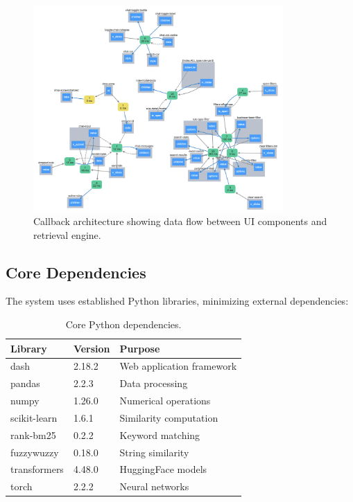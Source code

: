 \begin{figure}[!htbp]
\centering
\includegraphics[width=0.85\textwidth]{Figures/callback_map.png}
\caption{Callback architecture showing data flow between UI components and retrieval engine.}
\label{fig:callback-map}
\end{figure}

\subsection{Core Dependencies}

The system uses established Python libraries, minimizing external dependencies:

\begin{table}[!htbp]
\centering
\small
\begin{tabular}{lll}
\toprule
\textbf{Library} & \textbf{Version} & \textbf{Purpose} \\
\midrule
dash & 2.18.2 & Web application framework \\
pandas & 2.2.3 & Data processing \\
numpy & 1.26.0 & Numerical operations \\
scikit-learn & 1.6.1 & Similarity computation \\
rank-bm25 & 0.2.2 & Keyword matching \\
fuzzywuzzy & 0.18.0 & String similarity \\
transformers & 4.48.0 & HuggingFace models \\
torch & 2.2.2 & Neural networks \\
\bottomrule
\end{tabular}
\caption{Core Python dependencies.}
\label{tab:impl-dependencies}
\end{table}

